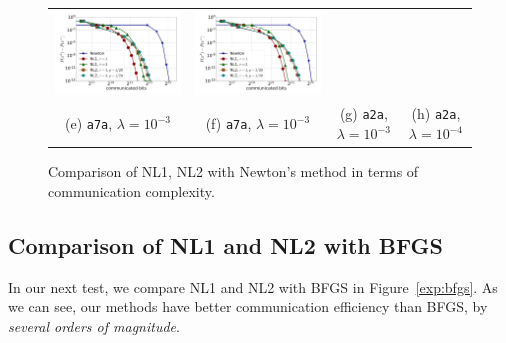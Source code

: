 \documentclass[12pt]{article}
\begin{document}
\begin{figure}[ht]
\begin{center}
{\begin{tabular}{cccc}
				\includegraphics[width = 0.23 \textwidth]{LogReg/a2a/Lambda=1e-3/a2a_nm_nl1_nl2_bits_lmb=0.001.pdf}&
				\includegraphics[width = 0.23 \textwidth]{LogReg/a2a/Lambda=1e-4/a2a_nm_nl1_nl2_bits_lmb=0.0001.pdf}
				\\
				(e) {\tt a7a}, $\lambda=10^{-3}$ &(f) {\tt a7a}, $\lambda=10^{-3}$ & (g) {\tt a2a}, $\lambda=10^{-3}$ &(h) {\tt a2a}, $\lambda=10^{-4}$
		\end{tabular}}
		\caption{Comparison of {\sf NL1}, {\sf NL2} with Newton's method in terms of communication complexity.}
		\label{exp:newton}
	\end{center}
\end{figure}



\subsection{Comparison of {\sf NL1} and {\sf NL2} with BFGS}

In our next test, we compare {\sf NL1} and {\sf NL2}  with BFGS in Figure~\ref{exp:bfgs}. As we can see, our methods have better communication efficiency than BFGS, by {\em several orders of magnitude}.
\end{document}
